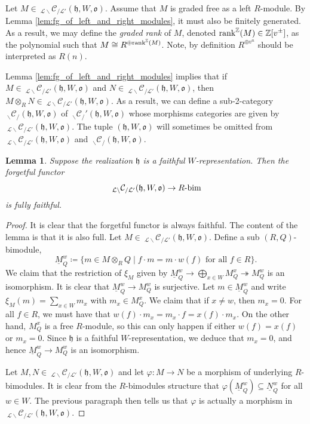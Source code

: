 \documentclass{amsart}
\newcommand{\Z}{\mathbb{Z}}
\newcommand{\scrL}{\mathcal{L}}
\newcommand{\bim}[1]{#1\textnormal{-bim}}
\newcommand{\fr}[1]{\mathfrak{#1}}
\newcommand{\Cmon}[2]{\:_{#1 \backslash} \mathcal{C}_{/ #2} }
\newcommand{\grk}{\textnormal{rank}^{\Z}}
\newtheorem{lemma}[subsubsection]{Lemma}
\theoremstyle{definition}
\numberwithin{equation}{subsection}
\begin{document}
Let $M \in \Cmon{\scrL}{\scrL'} (\fr{h}, W, \fr{o})$. Assume that $M$ is graded free as a left $R$-module. By Lemma \ref{lem:fg_of_left_and_right_modules}, it must also be finitely generated.
As a result, we may define the \emph{graded rank} of $M$, denoted $\grk (M) \in \Z [v^{\pm}]$, as the polynomial such that $M \cong R^{\oplus \grk (M)}$.
Note, by definition $R^{\oplus v^n}$ should be interpreted as $R (n)$. 

Lemma \ref{lem:fg_of_left_and_right_modules} implies that if $M \in \Cmon{\scrL}{\scrL'} (\fr{h}, W, \fr{o})$ and $N \in \Cmon{\scrL}{\scrL'} (\fr{h}, W, \fr{o})$, then $M \otimes_R N \in \Cmon{\scrL}{\scrL'} (\fr{h}, W, \fr{o})$.
As a result, we can define a sub-2-category $\Cmon{}{} (\fr{h}, W, \fr{o})$ of $\Cmon{}{}' (\fr{h}, W, \fr{o})$ whose morphisms categories are given by $\Cmon{\scrL}{\scrL'} (\fr{h}, W, \fr{o})$.
The tuple $(\fr{h}, W, \fr{o})$ will sometimes be omitted from $\Cmon{\scrL}{\scrL'} (\fr{h}, W, \fr{o})$ and $\Cmon{}{} (\fr{h}, W, \fr{o})$.

\begin{lemma}\label{lem:for_ff_on_faithful_realizations}
    Suppose the realization $\fr{h}$ is a faithful $W$-representation. Then the forgetful functor
    \[\Cmon{\scrL}{\scrL'} (\fr{h}, W, \fr{o}) \to \bim{R}\]
    is fully faithful. 
\end{lemma}
\begin{proof}
    It is clear that the forgetful functor is always faithful. The content of the lemma is that it is also full.
    Let $M \in \Cmon{\scrL}{\scrL'} (\fr{h}, W, \fr{o})$.
    Define a sub $(R,Q)$-bimodule,
    \[\underline{M}_Q^w \coloneq \{ m \in M \otimes_R Q \mid f \cdot m = m \cdot w(f) \text{ for all } f \in R\}.\]
    We claim that the restriction of $\xi_M$ given by $\underline{M}_Q^w \to \bigoplus_{x \in W} M_Q^x \twoheadrightarrow M_Q^w$ is an isomorphism.
    It is clear that $\underline{M}_Q^w \to M_Q^w$ is surjective. Let $m \in \underline{M}_Q^w$ and write $\xi_M (m) = \sum_{x \in W} m_x$ with $m_x \in M_Q^x$.
    We claim that if $x \neq w$, then $m_x = 0$. For all $f \in R$, we must have that $w (f) \cdot m_x =  m_x \cdot f = x (f) \cdot m_x$.
    On the other hand, $M_Q^x$ is a free $R$-module, so this can only happen if either $w (f) = x (f)$ or $m_x = 0$. Since $\fr{h}$ is a faithful $W$-representation, we deduce that $m_x = 0$, and hence $\underline{M}_Q^w \to M_Q^w$ is an isomorphism.

    Let $M,N \in \Cmon{\scrL}{\scrL'} (\fr{h}, W, \fr{o})$ and let $\varphi : M \to N$ be a morphism of underlying $R$-bimodules.
    It is clear from the $R$-bimodules structure that $\varphi (\underline{M}_Q^w) \subseteq \underline{N}_Q^w$ for all $w \in W$.
    The previous paragraph then tells us that $\varphi$ is actually a morphism in $\Cmon{\scrL}{\scrL'} (\fr{h}, W, \fr{o})$.
\end{proof}
\end{document}
